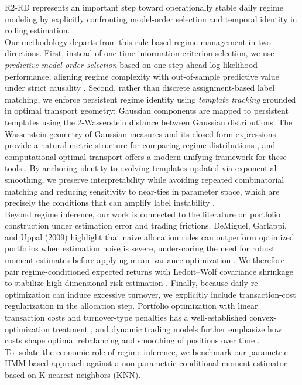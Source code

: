 \documentclass[11pt]{article}
\begin{document}
R2-RD represents an important step toward operationally stable daily regime modeling by explicitly confronting model-order selection and temporal identity in rolling estimation.\\
Our methodology departs from this rule-based regime management in two directions.
First, instead of one-time information-criterion selection, we use \emph{predictive model-order selection} based on one-step-ahead log-likelihood performance, aligning regime complexity with out-of-sample predictive value under strict causality \cite{Rabiner1989,CappeMoulinesRyden2005}.
Second, rather than discrete assignment-based label matching, we enforce persistent regime identity using \emph{template tracking} grounded in optimal transport geometry: Gaussian components are mapped to persistent templates using the 2-Wasserstein distance between Gaussian distributions.
The Wasserstein geometry of Gaussian measures and its closed-form expressions provide a natural metric structure for comparing regime distributions \cite{Takatsu2011}, and computational optimal transport offers a modern unifying framework for these tools \cite{PeyreCuturi2019,Villani2009}.
By anchoring identity to evolving templates updated via exponential smoothing, we preserve interpretability while avoiding repeated combinatorial matching and reducing sensitivity to near-ties in parameter space, which are precisely the conditions that can amplify label instability \cite{Stephens2000}.\\
Beyond regime inference, our work is connected to the literature on portfolio construction under estimation error and trading frictions.
DeMiguel, Garlappi, and Uppal (2009) highlight that naive allocation rules can outperform optimized portfolios when estimation noise is severe, underscoring the need for robust moment estimates before applying mean--variance optimization \cite{DeMiguel2009}.
We therefore pair regime-conditioned expected returns with Ledoit--Wolf covariance shrinkage to stabilize high-dimensional risk estimation \cite{LedoitWolf2004}.
Finally, because daily re-optimization can induce excessive turnover, we explicitly include transaction-cost regularization in the allocation step.
Portfolio optimization with linear transaction costs and turnover-type penalties has a well-established convex-optimization treatment \cite{LoboFazelBoyd2002}, and dynamic trading models further emphasize how costs shape optimal rebalancing and smoothing of positions over time \cite{GarleanuPedersen2013}.\\
To isolate the economic role of regime inference, we benchmark our parametric HMM-based approach against a non-parametric conditional-moment estimator based on K-nearest neighbors (KNN).
\end{document}
